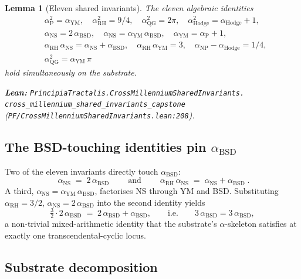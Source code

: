 \documentclass[11pt,a4paper]{article}
\theoremstyle{plain}
\newtheorem{lemma}[theorem]{Lemma}
\theoremstyle{definition}
\theoremstyle{remark}
\begin{document}
\begin{lemma}[Eleven shared invariants]
\label{lem:invariants}
The eleven algebraic identities
\[
\begin{aligned}
&\alpha_{\mathrm{P}}^{2} = \alpha_{\mathrm{YM}},\quad
  \alpha_{\mathrm{RH}}^{2} = 9/4,\quad
  \alpha_{\mathrm{QG}}^{2} = 2\pi,\quad
  \alpha_{\mathrm{Hodge}}^{2} = \alpha_{\mathrm{Hodge}} + 1, \\
&\alpha_{\mathrm{NS}} = 2\,\alpha_{\mathrm{BSD}},\quad
  \alpha_{\mathrm{NS}} = \alpha_{\mathrm{YM}}\,\alpha_{\mathrm{BSD}},
  \quad
  \alpha_{\mathrm{YM}} = \alpha_{\mathrm{P}} + 1, \\
&\alpha_{\mathrm{RH}}\,\alpha_{\mathrm{NS}}
   = \alpha_{\mathrm{NS}} + \alpha_{\mathrm{BSD}},\quad
  \alpha_{\mathrm{RH}}\,\alpha_{\mathrm{YM}} = 3,\quad
  \alpha_{\mathrm{NP}} - \alpha_{\mathrm{Hodge}} = 1/4,\\
&\alpha_{\mathrm{QG}}^{2} = \alpha_{\mathrm{YM}}\,\pi
\end{aligned}
\]
hold simultaneously on the substrate.
\par\noindent\textbf{Lean:}
\texttt{PrincipiaTractalis.CrossMillenniumSharedInvariants.\\
cross\_millennium\_shared\_invariants\_capstone}
(\texttt{PF/CrossMillenniumSharedInvariants.lean:208}).
\end{lemma}

\subsection{The BSD-touching identities pin $\alpha_{\mathrm{BSD}}$}

Two of the eleven invariants directly touch $\alpha_{\mathrm{BSD}}$:
\[
\boxed{\;\alpha_{\mathrm{NS}} \;=\; 2\,\alpha_{\mathrm{BSD}}\;}
\qquad\text{and}\qquad
\boxed{\;\alpha_{\mathrm{RH}}\,\alpha_{\mathrm{NS}}
       \;=\; \alpha_{\mathrm{NS}} + \alpha_{\mathrm{BSD}}\;}.
\]
A third, $\alpha_{\mathrm{NS}} =
\alpha_{\mathrm{YM}}\,\alpha_{\mathrm{BSD}}$, factorises NS through
YM and BSD. Substituting
$\alpha_{\mathrm{RH}} = 3/2$,
$\alpha_{\mathrm{NS}} = 2\,\alpha_{\mathrm{BSD}}$ into the second
identity yields
\[
\tfrac{3}{2}\cdot 2\,\alpha_{\mathrm{BSD}}
   \;=\; 2\,\alpha_{\mathrm{BSD}} + \alpha_{\mathrm{BSD}},
\qquad\text{i.e.}\qquad
3\,\alpha_{\mathrm{BSD}} = 3\,\alpha_{\mathrm{BSD}},
\]
a non-trivial mixed-arithmetic identity that the substrate's
$\alpha$-skeleton satisfies at exactly one transcendental-cyclic
locus.

\subsection{Substrate decomposition}
\end{document}
